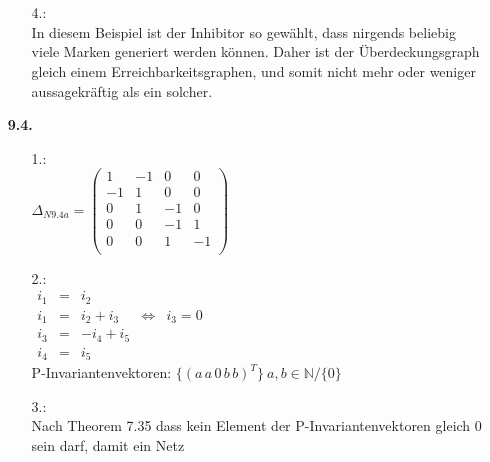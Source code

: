 \documentclass[a4paper,11pt,fleqn]{scrartcl}
\begin{document}
\begin{enumerate}
\begin{enumerate}
 \\ \\
			\item[4.:]\quad \\
				In diesem Beispiel ist der Inhibitor so gewählt, dass nirgends beliebig viele Marken
				generiert werden können. Daher ist der Überdeckungsgraph gleich einem Erreichbarkeitsgraphen, und
				somit nicht mehr oder weniger aussagekräftig als ein solcher.
		\end{enumerate}
		\item[\textbf{9.4.}]
		\begin{enumerate}
			\item[1.:]\quad \\
			\( \Delta_{N9.4a} =
			\begin{pmatrix}
				1 & -1 & 0 & 0 \\
				-1 & 1 & 0 & 0 \\
				0 & 1 & -1 & 0 \\
				0 & 0 & -1 & 1 \\
				0 & 0 & 1 & -1 \\
			\end{pmatrix}
			\)
			\item[2.:]\quad \\
			\(\begin{array}{rclcl}
				i_1 &=& i_2 \\
				i_1 &=& i_2 + i_3 &\Leftrightarrow & i_3 = 0 \\
				i_3 &=& -i_4 + i_5 \\
				i_4 &=& i_5
			\end{array}
			\) \\
			P-Invariantenvektoren: \(\Big\{(a\,a\,0\,b\,b)^T\Big\}\ a,b\in\mathbb{N}/\{0\}\)
			\item[3.:]\quad \\
				Nach Theorem 7.35 dass kein Element der P-Invariantenvektoren gleich 0 sein darf, damit ein Netz

\end{enumerate}
\end{enumerate}
\end{document}
